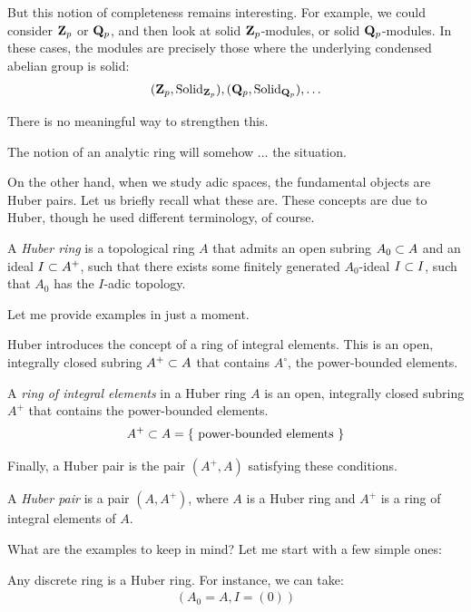 But this notion of completeness remains interesting. For example, we could consider $\mathbf Z_p$ or $\mathbf Q_p$, and then look at solid $\mathbf Z_p$-modules, or solid $\mathbf Q_p$-modules. In these cases, the modules are precisely those where the underlying condensed abelian group is solid:
\begin{align*}
(\mathbf Z_p, \mathrm{Solid}_{\mathbf Z_p}), (\mathbf Q_p, \mathrm{Solid}_{\mathbf Q_p}), \ldots
\end{align*}

There is no meaningful way to strengthen this.

The notion of an analytic ring will somehow ...  the situation.

On the other hand, when we study adic spaces, the fundamental objects are Huber pairs. Let us briefly recall what these are.
These concepts are due to Huber, though he used different terminology, of course.

A \textit{Huber ring} is a topological ring $A$ that admits an open subring $A_0 \subset A$ and an ideal $I \subset A^+$, such that there exists some finitely generated $A_0$-ideal $I \subset I$, such that $A_0$ has the $I$-adic topology.
\ed


Let me provide examples in just a moment.

Huber introduces the concept of a ring of integral elements. This is an open, integrally closed subring $A^+ \subset A$ that contains $A^{\circ}$, the power-bounded elements.

A \textit{ring of integral elements} in a Huber ring $A$ is an open, integrally closed subring $A^{+}$ that contains the power-bounded elements.
\begin{align*}
A^{+} \subset A = \{ \text{ power-bounded elements }  \}
\end{align*}
\ed

Finally, a Huber pair is the pair $(A^+, A)$ satisfying these conditions.

A \textit{Huber pair} is a pair $(A, A^{+})$, where $A$ is a Huber ring and $A^{+}$ is a ring of integral elements of $A$.
\ed

What are the examples to keep in mind? Let me start with a few simple ones:

\bex
Any discrete ring is a Huber ring. For instance, we can take:
\begin{align*}
(A_0 = A, I = (0))
\end{align*}
\eex

